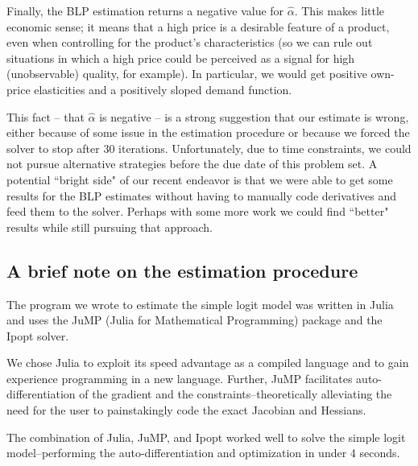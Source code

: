 \documentclass[a4paper,11pt]{article}
\begin{document}
Finally, the BLP estimation returns a negative value for $\hat\alpha$. This makes little economic sense; it means that a high price is a desirable feature of a product, even when controlling for the product's characteristics (so we can rule out situations in which a high price could be perceived as a signal for high (unobservable) quality, for example). In particular, we would get positive own-price elasticities and a positively sloped demand function.

This fact -- that $\hat\alpha$ is negative -- is a strong suggestion that our estimate is wrong, either because of some issue in the estimation procedure or because we forced the solver to stop after 30 iterations. Unfortunately, due to time constraints, we could not pursue alternative strategies before the due date of this problem set. A potential ``bright side" of our recent endeavor is that we were able to get some results for the BLP estimates without having to manually code derivatives and feed them to the solver. Perhaps with some more work we could find ``better" results while still pursuing that approach.



\subsection*{A brief note on the estimation procedure}
The program we wrote to estimate the simple logit model was written in Julia and uses the JuMP (Julia for Mathematical Programming) package and the Ipopt solver.

We chose Julia to exploit its speed advantage as a compiled language and to gain experience programming in a new language. Further, JuMP facilitates auto-differentiation of the gradient and the constraints--theoretically alleviating the need for the user to painstakingly code the exact Jacobian and Hessians.

The combination of Julia, JuMP, and Ipopt worked well to solve the simple logit model--performing the auto-differentiation and optimization in under 4 seconds.
\end{document}
